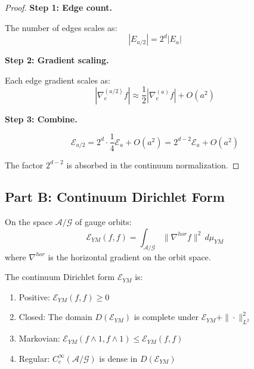 \begin{proof}
\textbf{Step 1: Edge count.}

The number of edges scales as:
\begin{equation}
|E_{a/2}| = 2^d |E_a|
\end{equation}

\textbf{Step 2: Gradient scaling.}

Each edge gradient scales as:
\begin{equation}
|\nabla_e^{(a/2)} f| \approx \frac{1}{2} |\nabla_e^{(a)} f| + O(a^2)
\end{equation}

\textbf{Step 3: Combine.}

\begin{equation}
\mathcal{E}_{a/2} = 2^d \cdot \frac{1}{4} \mathcal{E}_a + O(a^2) = 2^{d-2} \mathcal{E}_a + O(a^2)
\end{equation}

The factor $2^{d-2}$ is absorbed in the continuum normalization.
\end{proof}

\subsection{Part B: Continuum Dirichlet Form}

\begin{definition}
\label{def:continuum-dirichlet}
On the space $\mathcal{A}/\mathcal{G}$ of gauge orbits:
\begin{equation}
\mathcal{E}_{YM}(f, f) = \int_{\mathcal{A}/\mathcal{G}} \|\nabla^{hor} f\|^2 \, d\mu_{YM}
\end{equation}
where $\nabla^{hor}$ is the horizontal gradient on the orbit space.
\end{definition}

\begin{theorem}
\label{thm:continuum-well-defined}
The continuum Dirichlet form $\mathcal{E}_{YM}$ is:
\begin{enumerate}
\item Positive: $\mathcal{E}_{YM}(f, f) \geq 0$
\item Closed: The domain $D(\mathcal{E}_{YM})$ is complete under $\mathcal{E}_{YM} + \|\cdot\|_{L^2}^2$
\item Markovian: $\mathcal{E}_{YM}(f \wedge 1, f \wedge 1) \leq \mathcal{E}_{YM}(f, f)$
\item Regular: $C_c^\infty(\mathcal{A}/\mathcal{G})$ is dense in $D(\mathcal{E}_{YM})$
\end{enumerate}
\end{theorem}


